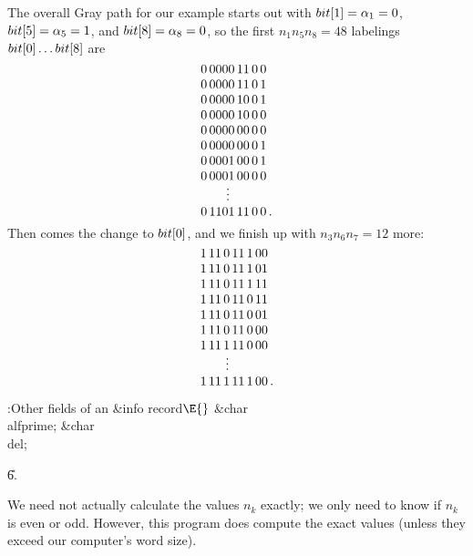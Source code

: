 \fi

The overall Gray path for our example starts out with
$\\{bit}[1]=\alpha_1=0$, $\\{bit}[5]=\alpha_5=1$,
and $\\{bit}[8]=\allowbreak\alpha_8=0$,
so the first $n_1n_5n_8=48$ labelings $\\{bit}[0]\ldots\\{bit}[8]$ are
$$\vbox{\halign{$#$\hfill\cr
0\,0000\,11\,0\,0\cr
0\,0000\,11\,0\,1\cr
0\,0000\,10\,0\,1\cr
0\,0000\,10\,0\,0\cr
0\,0000\,00\,0\,0\cr
0\,0000\,00\,0\,1\cr
0\,0001\,00\,0\,1\cr
0\,0001\,00\,0\,0\cr
\qquad\vdots\cr
0\,1101\,11\,0\,0\,.\cr}}$$
Then comes the change to $\\{bit}[0]$, and we finish up with $n_3n_6n_7=12$ more:
$$\vbox{\halign{$#$\hfill\cr
1\,11\,0\,11\,1\,00\cr
1\,11\,0\,11\,1\,01\cr
1\,11\,0\,11\,1\,11\cr
1\,11\,0\,11\,0\,11\cr
1\,11\,0\,11\,0\,01\cr
1\,11\,0\,11\,0\,00\cr
1\,11\,1\,11\,0\,00\cr
\qquad\vdots\cr
1\,11\,1\,11\,1\,00\,.\cr}}$$

\fi

\B{}:Other fields of an \&{info} record\X${}\E{}$\6
\&{char} \\{alfprime};\6
\&{char} \\{del};\par
\U6.\fi

We need not actually calculate the values $n_k$ exactly;
we only need
to know if $n_k$ is even or odd. However, this program does compute the
exact values (unless they exceed our computer's word size).


